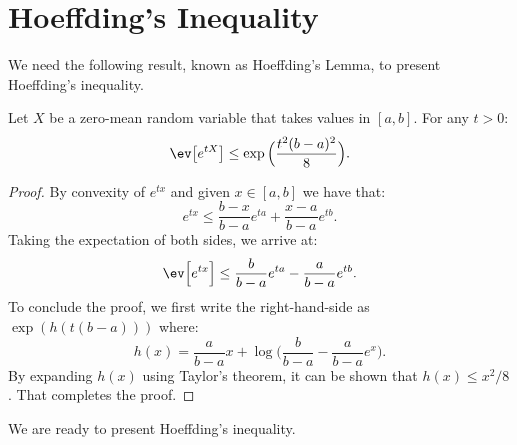 \section{Hoeffding's Inequality}

We need the following result, known as Hoeffding's Lemma, to present
Hoeffding's inequality.

\begin{lemma}
    \label{lemma:appendix:concentration:hoeffding-lemma}
    Let $X$ be a zero-mean random variable that takes values in $[a, b]$.
    For any $t > 0$:
    \begin{equation*}
        \ev\big[ e^{tX} \big] \leq \exp\Big( \frac{t^2 (b - a)^2}{8} \Big).
    \end{equation*}
\end{lemma}
\begin{proof}
    By convexity of $e^{tx}$ and given $x \in [a, b]$ we have that:
    \begin{equation*}
        e^{tx} \leq \frac{b - x}{b - a} e^{ta} +
            \frac{x - a}{b - a} e^{tb}.
    \end{equation*}
    Taking the expectation of both sides, we arrive at:
    \begin{equation*}
        \ev\Big[e^{tx}\Big] \leq
            \frac{b}{b - a} e^{ta} - \frac{a}{b - a} e^{tb}.
    \end{equation*}
    To conclude the proof, we first write the right-hand-side as
    $\exp(h(t(b - a)))$ where:
    \begin{equation*}
        h(x) = \frac{a}{b - a} x + \log \Big( \frac{b}{b - a} - \frac{a}{b - a} e^x \Big).
    \end{equation*}
    By expanding $h(x)$ using Taylor's theorem, it can be shown that
    $h(x) \leq x^2/8$. That completes the proof.
\end{proof}

We are ready to present Hoeffding's inequality.

